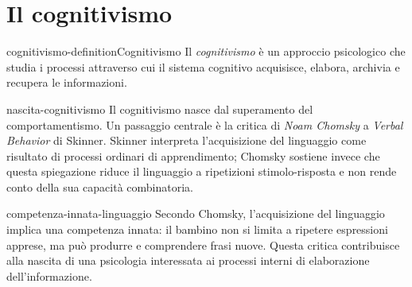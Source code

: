\documentclass[preview]{standalone}
\begin{document}
\genpage

\section{Il cognitivismo}

\begin{snippetdefinition}{cognitivismo-definition}{Cognitivismo}
    Il \emph{cognitivismo} è un approccio psicologico che studia i processi
    attraverso cui il sistema cognitivo acquisisce, elabora, archivia e
    recupera le informazioni.
\end{snippetdefinition}

\begin{snippet}{nascita-cognitivismo}
    Il cognitivismo nasce dal superamento del comportamentismo. Un passaggio
    centrale è la critica di \emph{Noam Chomsky} a \emph{Verbal Behavior} di
    Skinner. Skinner interpreta l'acquisizione del linguaggio come risultato di
    processi ordinari di apprendimento; Chomsky sostiene invece che questa
    spiegazione riduce il linguaggio a ripetizioni stimolo-risposta e non rende
    conto della sua capacità combinatoria.
\end{snippet}

\begin{snippet}{competenza-innata-linguaggio}
    Secondo Chomsky, l'acquisizione del linguaggio implica una competenza
    innata: il bambino non si limita a ripetere espressioni apprese, ma può
    produrre e comprendere frasi nuove. Questa critica contribuisce alla
    nascita di una psicologia interessata ai processi interni di elaborazione
    dell'informazione.
\end{snippet}
\end{document}
